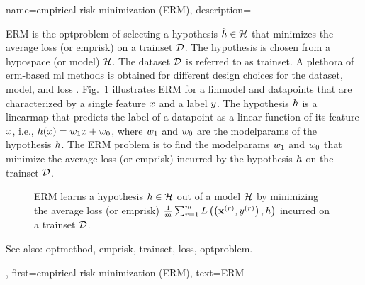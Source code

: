 {name={empirical risk minimization (ERM)}, 
	description={ERM is the \gls{optproblem} of 
	selecting a \gls{hypothesis} $\hat{h} \in \mathcal{H}$ that minimizes the 
	average \gls{loss} (or \gls{emprisk}) on a \gls{trainset} $\mathcal{D}$. 
	The \gls{hypothesis} is chosen from a \gls{hypospace} (or \gls{model}) $\mathcal{H}$. 
	The \gls{dataset} $\mathcal{D}$ is referred to as \gls{trainset}. A plethora of \gls{erm}-based 
	\gls{ml} methods is obtained for different design choices for the \gls{dataset}, \gls{model}, 
	and \gls{loss} \cite[Ch. 3]{MLBasics}. Fig.\ \ref{fig_erm_dict} illustrates ERM for a \gls{linmodel} 
	and \glspl{datapoint} that are characterized by a single \gls{feature} $x$ and a \gls{label} $y$. 
	The \gls{hypothesis} $h$ is a \gls{linearmap} that predicts the \gls{label} 
	of a \gls{datapoint} as a linear \gls{function} of its \gls{feature} $x$, i.e., 
		$h(x) = w_{1} x + w_{0}$, where $w_{1}$ 
	and $w_{0}$ are the \glspl{modelparam} of the \gls{hypothesis} $h$. 
	The ERM problem is to find the \glspl{modelparam} $w_{1}$ and $w_{0}$ that 
	minimize the average \gls{loss} (or \gls{emprisk}) incurred by the \gls{hypothesis} 
	$h$ on the \gls{trainset} $\mathcal{D}$.
    \begin{figure}[H]
\begin{center}
\caption{ERM learns a \gls{hypothesis} $h \in \mathcal{H}$ 
out of a \gls{model} $\mathcal{H}$ by minimizing the average \gls{loss} 
(or \gls{emprisk}) $\frac{1}{m} \sum_{r=1}^m L\left(\left( {\bf x}^{(r)}, y^{(r)} \right),h \right)$ incurred on a \gls{trainset} $\mathcal{D}$.}
\label{fig_erm_dict}
\end{center}
\end{figure}
		See also: \gls{optmethod}, \gls{emprisk}, \gls{trainset}, \gls{loss}, \gls{optproblem}.},
	first={empirical risk minimization (ERM)},
	text={ERM} 
}


